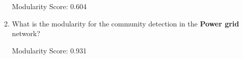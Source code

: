 \documentclass{amsart}
\theoremstyle{definition}
\theoremstyle{remark}
\numberwithin{equation}{section}
\begin{document}
\begin{enumerate}
\begin{enumerate}
        Modularity Score: 0.604

        \vspace{0.5 cm}

        \item What is the modularity for the community detection in the \textbf{Power grid} network? \vspace{0.5 cm}

        Modularity Score: 0.931 

        \vspace{0.5 cm}

    \end{enumerate}
\end{enumerate}
\end{document}
